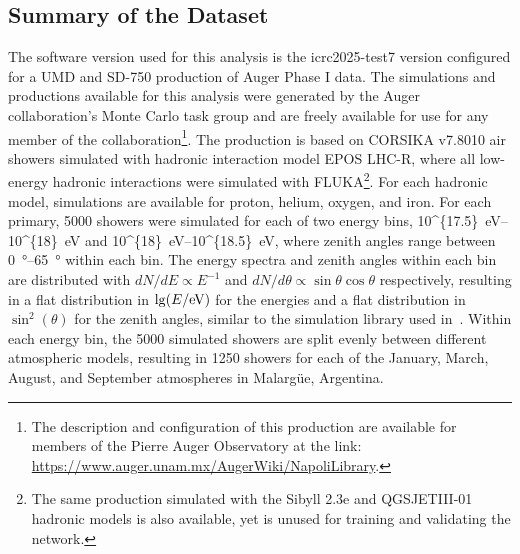 
\subsection{Summary of the Dataset}\label{ssec:data_summary}
The software version used for this analysis is the \Offline icrc2025-test7 version configured for a UMD and SD-750 production of Auger Phase I data.
The simulations and \Offline productions available for this analysis were generated by the Auger collaboration's Monte Carlo task group and are freely available for use for any member of the collaboration\footnote[1]{The description and \Offline configuration of this production are available for members of the Pierre Auger Observatory at the link: \href{https://www.auger.unam.mx/AugerWiki/NapoliLibrary\#head-f39e6bd21998ef5a242dd9f7b33fbc10abc1642f}{https://www.auger.unam.mx/AugerWiki/NapoliLibrary}.}.
The production is based on CORSIKA v7.8010 air showers simulated with hadronic interaction model EPOS LHC-R, where all low-energy hadronic interactions were simulated with FLUKA\footnote[2]{The same production simulated with the Sibyll 2.3e and QGSJETIII-01 hadronic models is also available, yet is unused for training and validating the network.}.
For each hadronic model, simulations are available for proton, helium, oxygen, and iron.
For each primary, 5000 showers were simulated for each of two energy bins, \qtyrange[parse-numbers=false]{10^{17.5}}{10^{18}}{\electronvolt} and \qtyrange[parse-numbers=false]{10^{18}}{10^{18.5}}{\electronvolt}, where zenith angles range between \qtyrange{0}{65}{\degree} within each bin.
The energy spectra and zenith angles within each bin are distributed with $dN/dE \propto E^{-1}$ and $dN/d\theta \propto \sin\theta\cos\theta$ respectively, resulting in a flat distribution in $\lg(E / \rm eV)$ for the energies and a flat distribution in $\sin^{2}(\theta)$ for the zenith angles, similar to the simulation library used in~.
Within each energy bin, the 5000 simulated showers are split evenly between different atmospheric models, resulting in 1250 showers for each of the January, March, August, and September atmospheres in Malarg\"{u}e, Argentina.

